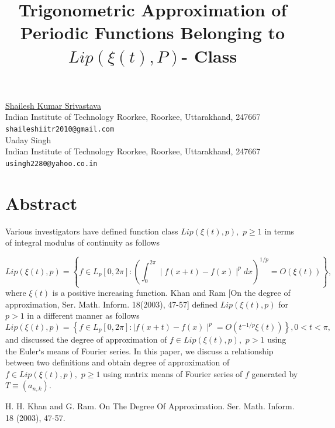 \documentclass[article,A4,11pt]{llncs}%
\begin{document}
\title{Trigonometric Approximation of Periodic Functions Belonging to $Lip(\xi(t), P)$- Class}
 \author{} \institute{}
\maketitle
\begin{center}
{\large \underline{Shailesh Kumar Srivastava}}\\
Indian Institute of Technology Roorkee, Roorkee, Uttarakhand, 247667\\
{\tt shaileshiitr2010@gmail.com}
\\ \vspace{4mm}
{\large Uaday Singh}\\
Indian Institute of Technology Roorkee, Roorkee, Uttarakhand, 247667\\
{\tt usingh2280@yahoo.co.in}
\end{center}

\section*{Abstract}
Various investigators have defined function class  $Lip(\xi(t), p),$ $p\geq1$ in terms of integral modulus of continuity as follows

\begin{equation}
Lip(\xi(t), p)=\left\{f\in L_{p}[0,2\pi]: \left(\int_{0}^{2\pi}\mid f(x+t)-f(x)\mid^{p}dx \right)^{1/p}= O(\xi(t))\right\},
 \end{equation}
 where $\xi(t)$ is a positive increasing function. Khan and Ram [On the degree of approximation, Ser. Math. Inform. 18(2003), 47-57] defined $Lip(\xi(t), p)$ for $p> 1$ in a different manner as follows
 \begin{equation}
Lip(\xi(t), p)=\left\{f\in L_{p}[0,2\pi]: \mid f(x+t)-f(x)\mid^{p}= O(t^{-1/p}\xi(t))\right\}, 0 < t<\pi ,
 \end{equation}
and discussed the degree of approximation of $f \in Lip(\xi(t), p),$ $p >1$ using the Euler`s means of Fourier series. In this paper, we discuss a relationship between two definitions and obtain degree of approximation of $f \in Lip(\xi(t), p),$ $p\geq 1$ using matrix means of Fourier series of $f$ generated by $T\equiv (a_{n,k}).$


\begin{thebibliography}{10}
{\sc H. H. Khan and G. Ram}. {On The Degree Of Approximation}. Ser. Math. Inform. 18 (2003), 47-57.
\end{thebibliography}
\end{document}
